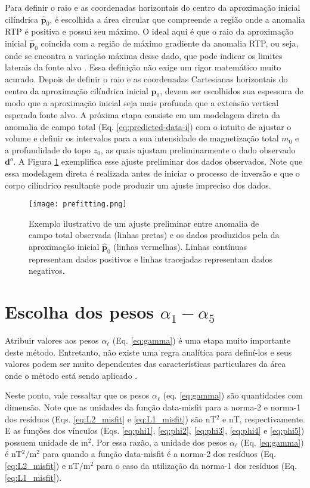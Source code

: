 Para definir o raio e as coordenadas horizontais do centro da aproximação inicial cilíndrica $ \hat{\mathbf{p}}_0 $, é escolhida a área circular que compreende a região onde a anomalia RTP é positiva e possui seu máximo.
O ideal aqui é que o raio da aproximação inicial $ \hat{\mathbf{p}}_0 $ coincida com a região de máximo gradiente da anomalia RTP, ou seja, onde se encontra a variação máxima desse dado, que pode indicar os limites laterais da fonte alvo \citep{baranov1957}.
Essa definição não exige um rigor matemático muito acurado.
Depois de definir o raio e as coordenadas Cartesianas horizontais do centro da aproximação cilíndrica inicial $ \hat{\mathbf{p}}_0 $, devem ser escolhidos sua espessura de modo que a aproximação inicial seja mais profunda que a extensão vertical esperada fonte alvo.
A próxima etapa consiste em um modelagem direta da anomalia de campo total (Eq. \ref{eq:predicted-data-i}) com o intuito de ajustar o volume e definir os intervalos para a sua intensidade de magnetização total $m_{0}$ e a profundidade do topo $z_{0}$, as quais ajustam preliminarmente o dado observado $ \mathbf{d}^o $.
A Figura \ref{fig:prefit} exemplifica esse ajuste preliminar dos dados observados.
Note que essa modelagem direta é realizada antes de iniciar o processo de inversão e 
que o corpo cilíndrico resultante pode produzir um ajuste impreciso dos dados.

\begin{figure}[!htb]
	\centering
	\texttt{[image: prefitting.png]}
	\caption{Exemplo ilustrativo de um ajuste preliminar entre anomalia de campo total observada (linhas pretas) e os dados produzidos pela da aproximação inicial $ \hat{\mathbf{p}}_0 $ (linhas vermelhas). Linhas contínuas representam dados positivos e linhas tracejadas representam dados negativos.}
	\label{fig:prefit}
\end{figure}

\section{Escolha dos pesos $\alpha_{1}-\alpha_{5}$}

Atribuir valores aos pesos $ \alpha_{\ell} $ (Eq. \ref{eq:gamma}) é uma etapa muito importante deste método.
Entretanto, não existe uma regra analítica para definí-los e seus valores podem ser muito dependentes das características particulares da área onde o método está sendo aplicado \cite[]{silva-2001,bastos-2020}.

Neste ponto, vale ressaltar que os pesos $ \alpha_{\ell}$ (eq. \ref{eq:gamma}) são quantidades com dimensão.
Note que as unidades da função data-misfit para a norma-2 e norma-1 dos resíduos (Eqs. \ref{eq:L2_misfit} e \ref{eq:L1_misfit}) são nT$^2$ e nT, respectivamente.
E as funções dos vínculos (Eqs. \ref{eq:phi1}, \ref{eq:phi2}, \ref{eq:phi3}, \ref{eq:phi4} e \ref{eq:phi5}) possuem unidade de m$^2$.
Por essa razão, a unidade dos pesos $ \alpha_{\ell} $ (Eq. \ref{eq:gamma}) é nT$^{2}/$m$^{2}$ para quando a função data-misfit é a norma-2 dos resíduos (Eq. \ref{eq:L2_misfit}) e nT$/$m$^{2}$ para o caso da utilização da norma-1 dos resíduos (Eq. \ref{eq:L1_misfit}).

